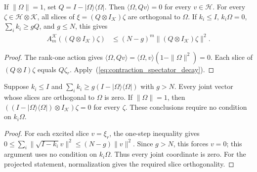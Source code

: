 \begin{theorem}
    \label{thm:contraction_spectator_projection}
    \leanok
    If $\|\Omega\|=1$, set $Q=I-|\Omega\rangle\langle\Omega|$.
    Then $\langle\Omega,Qv\rangle=0$ for every $v\in\mathcal H$.
    For every $\zeta\in\mathcal H\otimes\mathcal K$, all slices of
    $\xi=(Q\otimes I_{\mathcal K})\zeta$ are orthogonal to $\Omega$.
    If $k_i\le I$, $k_i\Omega=0$, $\sum_i k_i\ge gQ$, and $g\le N$,
    this gives
    \begin{align}
        A_m^{\mathcal K}((Q\otimes I_{\mathcal K})\zeta)
         &\le(N-g)^m\|(Q\otimes I_{\mathcal K})\zeta\|^2.
        \label{eq:contraction_spectator_projection}
    \end{align}
\end{theorem}
\begin{proof}
    \leanok
    The rank-one action gives
    $\langle\Omega,Qv\rangle
    =\langle\Omega,v\rangle(1-\|\Omega\|^2)=0$.
    Each slice of $(Q\otimes I)\zeta$ equals $Q\zeta_r$.
    Apply~(\ref{eq:contraction_spectator_decay}).
\end{proof}

\begin{theorem}
    \label{thm:contraction_spectator_large_gap}
    \leanok
    Suppose $k_i\le I$ and
    $\sum_i k_i\ge g(I-|\Omega\rangle\langle\Omega|)$ with $g>N$.
    Every joint vector whose slices are orthogonal to $\Omega$ is zero.
    If $\|\Omega\|=1$, then
    $((I-|\Omega\rangle\langle\Omega|)\otimes I_{\mathcal K})\zeta=0$
    for every $\zeta$. These conclusions require no condition on
    $k_i\Omega$.
\end{theorem}
\begin{proof}
    \leanok
    For each excited slice $v=\xi_r$, the one-step inequality gives
    $0\le\sum_i\|\sqrt{I-k_i}v\|^2\le(N-g)\|v\|^2$.
    Since $g>N$, this forces $v=0$; this argument uses no condition on
    $k_i\Omega$. Thus every joint coordinate is zero. For the projected
    statement, normalization gives the required slice orthogonality.
\end{proof}
